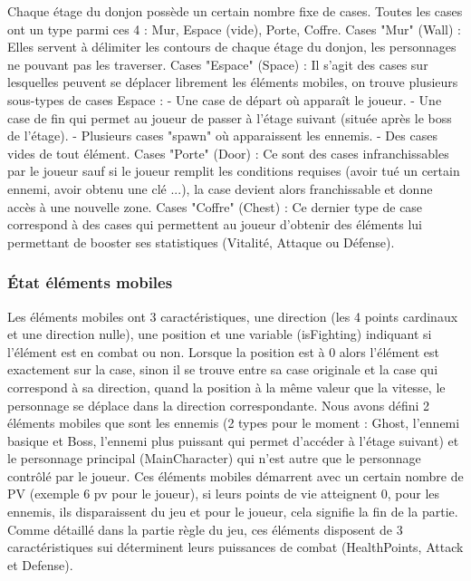 \documentclass[a4paper,12pt]{article}
\begin{document}
Chaque étage du donjon possède un certain nombre fixe de cases. Toutes les cases ont un type parmi ces 4 : Mur, Espace (vide), Porte, Coffre.
\bigbreak
Cases "Mur" (Wall) : Elles servent à délimiter les contours de chaque étage du donjon, les personnages ne pouvant pas les traverser.
\bigbreak
Cases "Espace" (Space) : Il s'agit des cases sur lesquelles peuvent se déplacer librement les éléments mobiles, on trouve plusieurs sous-types de cases Espace :
- Une case de départ où apparaît le joueur.
- Une case de fin qui permet au joueur de passer à l'étage suivant (située après le boss de l'étage).
- Plusieurs cases "spawn" où apparaissent les ennemis.
- Des cases vides de tout élément.
\bigbreak
Cases "Porte" (Door) : Ce sont des cases infranchissables par le joueur sauf si le joueur remplit les conditions requises (avoir tué un certain ennemi, avoir obtenu une clé ...), la case devient alors franchissable et donne accès à une nouvelle zone.
\bigbreak
Cases "Coffre" (Chest) : Ce dernier type de case correspond à des cases qui permettent au joueur d'obtenir des éléments lui permettant de booster ses statistiques (Vitalité, Attaque ou Défense).

\subsubsection{État éléments mobiles}

Les éléments mobiles ont 3 caractéristiques, une direction (les 4 points cardinaux et une direction nulle), une position et une variable (isFighting) indiquant si l'élément est en combat ou non.
Lorsque la position est à 0 alors l'élément est exactement sur la case, sinon il se trouve entre sa case originale et la case qui correspond à sa direction, quand la position à la même valeur que la vitesse, le personnage se déplace dans la direction correspondante.
\bigbreak
Nous avons défini 2 éléments mobiles que sont les ennemis (2 types pour le moment : Ghost, l'ennemi basique et Boss, l'ennemi plus puissant qui permet d'accéder à l'étage suivant) et le personnage principal (MainCharacter) qui n'est autre que le personnage contrôlé par le joueur.
Ces éléments mobiles démarrent avec un certain nombre de PV (exemple 6 pv pour le joueur), si leurs points de vie atteignent 0, pour les ennemis, ils disparaissent du jeu et pour le joueur, cela signifie la fin de la partie.
Comme détaillé dans la partie règle du jeu, ces éléments disposent de 3 caractéristiques sui déterminent leurs puissances de combat (HealthPoints, Attack et Defense).
\end{document}

